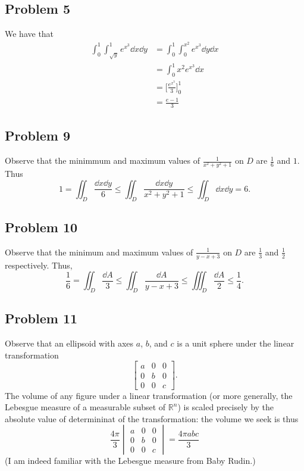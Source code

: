 \documentclass[11pt]{article}
\begin{document}
\subsection*{Problem 5}
We have that
\begin{align*}
	\int_{0}^{1} \int_{\sqrt{y}}^{1} e^{x^{3}} \dd{x} \dd{y} &= \int_{0}^{1} \int_{0}^{x^{2}} e^{x^{3}} \dd{y} \dd{x} \\
	&= \int_{0}^{1} x^{2} e^{x^{3}} \dd{x} \\
	&= \Big[ \frac{e^{x^{3}}}{3} \Big]_{0}^{1} \\
	&= \boxed{\frac{e - 1}{3}}
\end{align*}


\subsection*{Problem 9}

Observe that the minimmum and maximum values of $\tfrac{1}{x^{2} + y^{2} + 1}$ on $D$ are $\tfrac{1}{6}$ and $1$. Thus
\[
	1 = \iint_{D} \frac{\dd{x} \dd{y}}{6} \le \iint_{D} \frac{\dd{x} \dd{y}}{x^{2} + y^{2} + 1} \le \iint_{D} \dd{x} \dd{y} = 6.
\]


\subsection*{Problem 10}

Observe that the minimum and maximum values of $\tfrac{1}{y - x + 3}$ on $D$ are $\tfrac{1}{3}$ and $\frac{1}{2}$ respectively. Thus,
\[
	\frac{1}{6} = \iint_{D} \frac{\dd{A}}{3} \le \iint_{D} \frac{\dd{A} }{y - x + 3} \le \iiint_{D} \frac{\dd{A} }{2} \le \frac{1}{4}.
\]


\subsection*{Problem 11}

Observe that an ellipsoid with axes $a$, $b$, and $c$ is a unit sphere under the linear transformation
\[
	\begin{bmatrix} a & 0 & 0 \\ 0 & b & 0 \\ 0 & 0 & c \end{bmatrix}.
\]
The volume of any figure under a linear transformation (or more generally, the Lebesgue measure of a measurable subset of $\mathbb{R}^{n}$) is scaled precisely by the absolute value of determininat of the transformation: the volume we seek is thus
\[
	\frac{4\pi}{3} \begin{vmatrix} a & 0 & 0 \\ 0 & b & 0 \\ 0 & 0 & c \end{vmatrix} = \boxed{\frac{4\pi abc}{3}}
\]
(I am indeed familiar with the Lebesgue measure from Baby Rudin.)
\end{document}
